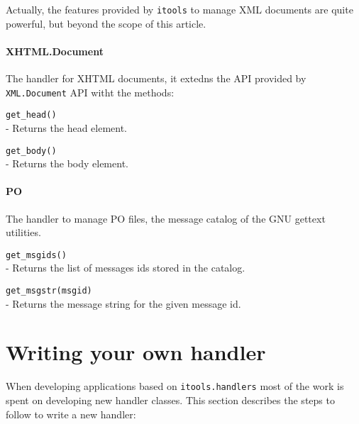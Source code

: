Actually, the features provided by {\tt itools} to manage XML documents
are quite powerful, but beyond the scope of this article.

\paragraph{XHTML.Document}

The handler for XHTML documents, it extedns the API provided by
{\tt XML.Document} API witht the methods:

\begin{api}
  {\tt get\_head()}\\
  - Returns the head element.

  {\tt get\_body()}\\
  - Returns the body element.
\end{api}

\paragraph{PO}

The handler to manage PO files, the message catalog of the GNU gettext
utilities.

\begin{api}
  {\tt get\_msgids()}\\
  - Returns the list of messages ids stored in the catalog.

  {\tt get\_msgstr(msgid)}\\
  - Returns the message string for the given message id.
\end{api}



\section{Writing your own handler}

When developing applications based on {\tt itools.handlers} most of the
work is spent on developing new handler classes. This section describes
the steps to follow to write a new handler:

